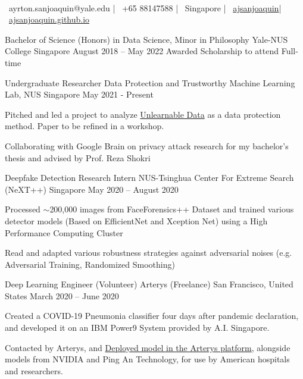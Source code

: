\documentclass[]{awesome-cv}
\begin{document}
    
\begin{center}
	 \  \\
	{\faEnvelope\ ayrton.sanjoaquin@yale.edu} | {\faMobile\ +65 88147588} | {\faMapMarker\ Singapore} | {\faLinkedinSquare\ \href{https://www.linkedin.com/in/ajsanjoaquin/}{ajsanjoaquin}}| {\faLink\ \href{http://ajsanjoaquin.github.io/}{ajsanjoaquin.github.io}}
\end{center}
\begin{cventries}
	\cventry
	{Bachelor of Science (Honors) in Data Science, Minor in Philosophy}
	{Yale-NUS College}
	{Singapore}
	{August 2018 – May 2022}
	{Awarded Scholarship to attend Full-time}
\end{cventries}
\begin{cventries}
	\cventry
	{Undergraduate Researcher}
	{Data Protection and Trustworthy Machine Learning Lab, NUS}
	{Singapore}
	{May 2021 - Present}
	{\begin{cvitems}
		\item {Pitched and led a project to analyze \href{https://arxiv.org/abs/2101.04898}{Unlearnable Data} as a data protection method. Paper to be refined in a workshop.}
		\item {Collaborating with Google Brain on privacy attack research for my bachelor's thesis and advised by Prof. Reza Shokri}
		\end{cvitems}}
	\cventry
	{Deepfake Detection Research Intern}
	{NUS-Tsinghua Center For Extreme Search (NeXT++)}
	{Singapore}
	{May 2020 – August 2020}
	{\begin{cvitems}
		\item {Processed $\sim$200,000 images from FaceForensics++ Dataset and trained various detector models (Based on EfficientNet and Xception Net) using a High Performance Computing Cluster}
		\item {Read and adapted various robustness strategies against adversarial noises (e.g. Adversarial Training, Randomized Smoothing)}
		\end{cvitems}}
	\cventry
	{Deep Learning Engineer (Volunteer)}
	{Arterys (Freelance)}
	{San Francisco, United States}
	{March 2020 – June 2020}
	{\begin{cvitems}
		\item {Created a COVID-19 Pneumonia classifier four days after pandemic declaration, and developed it on an IBM Power9 System provided by A.I. Singapore.}
		\item {Contacted by Arterys, and \href{https://marketplace.arterys.com/model/ayrtoncovidXR}{Deployed model in the Arterys platform}, 
		alongside models from NVIDIA and Ping An Technology, for use by American hospitals and researchers.}
		\end{cvitems}}
\end{cventries}
\end{document}
